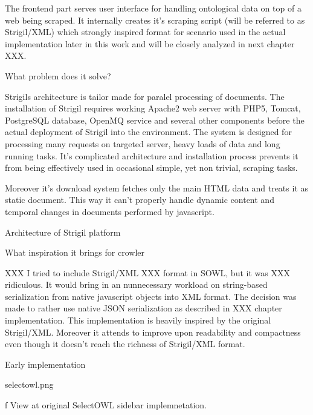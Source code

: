 The frontend part serves user interface for handling ontological data on top of
a web being scraped. It internally creates it's scraping script (will be
referred to as Strigil/XML) which strongly inspired format for scenario used in
the actual implementation later in this work and will be closely analyzed in
next chapter XXX. 


\secc What problem does it solve?

Strigils architecture is tailor made for paralel processing of documents.  The
installation of Strigil requires working Apache2 web server with PHP5, Tomcat,
PostgreSQL database, OpenMQ service and several other components before the
actual deployment of Strigil into the environment. The system is designed for
processing many requests on targeted server, heavy loads of data and long
running tasks. It's complicated architecture and installation process prevents
it from being effectively used in occasional simple, yet non trivial, scraping
tasks. 

Moreover it's download system fetches only the main HTML data and treats it as
static document. This way it can't properly handle dynamic content and temporal
changes in documents performed by javascript. 


\secc Architecture of Strigil platform



\secc What inspiration it brings for crowler

XXX I tried to include Strigil/XML XXX format in SOWL, but it was XXX
ridiculous. It would bring in an nunnecessary workload on string-based
serialization from native javascript objects into XML format. The decision was
made to rather use native JSON serialization as described in XXX chapter
implementation. This implementation is heavily inspired by the original
Strigil/XML. Moreover it attends to improve upon readability and compactness
even though it doesn't reach the richness of Strigil/XML format. 

%


\sec Early implementation



\midinsert
\picw=7cm \cinspic selectowl.png
\caption/f View at original SelectOWL sidebar implemnetation. 
\endinsert


